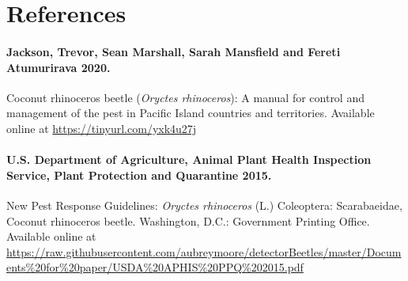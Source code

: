 \documentclass[twocolumn,letterpaper]{scrartcl}
\begin{document}
\section{References}

\paragraph{Jackson, Trevor, Sean Marshall, Sarah Mansfield and Fereti Atumurirava 2020.} Coconut rhinoceros beetle (\textit{Oryctes rhinoceros}): A manual for control and management of the pest in Pacific Island countries and territories. Available online at \url{https://tinyurl.com/yxk4u27j} 

\paragraph{U.S. Department of Agriculture, Animal Plant Health Inspection Service, Plant Protection and Quarantine 2015.} New Pest Response Guidelines: \textit{Oryctes rhinoceros} (L.) Coleoptera: Scarabaeidae, Coconut rhinoceros beetle. Washington, D.C.: Government Printing Office. Available online at  \url{https://raw.githubusercontent.com/aubreymoore/detectorBeetles/master/Documents\%20for\%20paper/USDA\%20APHIS\%20PPQ\%202015.pdf}

%
%
\end{document}
